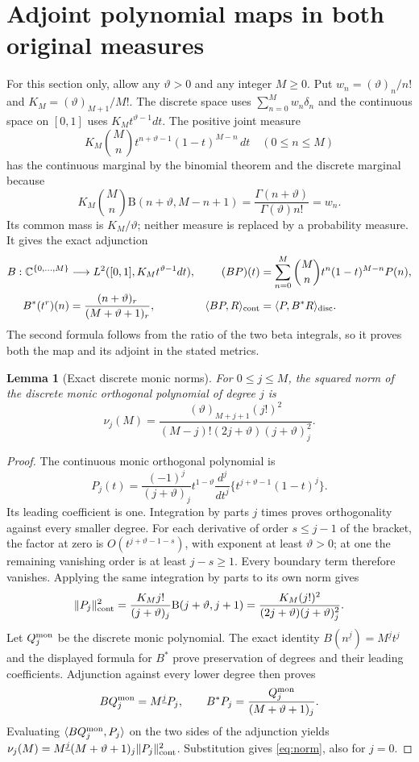 \documentclass[11pt,a4paper]{article}
\newtheorem{lemma}[theorem]{Lemma}
\newcommand{\C}{\mathbb C}
\begin{document}
\section{Adjoint polynomial maps in both original measures}
For this section only, allow any $\vartheta>0$ and any integer $M\ge0$.
Put $w_n=(\vartheta)_n/n!$ and $K_M=(\vartheta)_{M+1}/M!$.
The discrete space uses $\sum_{n=0}^Mw_n\delta_n$ and the continuous
space on $[0,1]$ uses $K_Mt^{\vartheta-1}dt$.
The positive joint measure
\[
 K_M\binom Mn t^{n+\vartheta-1}(1-t)^{M-n}\,dt
 \quad (0\le n\le M)
\]
has the continuous marginal by the binomial theorem and the discrete
marginal because
\[
 K_M\binom Mn\mathrm B(n+\vartheta,M-n+1)
 =\frac{\Gamma(n+\vartheta)}{\Gamma(\vartheta)n!}=w_n.
\]
Its common mass is $K_M/\vartheta$; neither measure is replaced by a
probability measure. It gives the exact adjunction
\begin{align*}
 B:\C^{\{0,\ldots,M\}}&\longrightarrow L^2([0,1],K_Mt^{\vartheta-1}dt),
 & (BP)(t)&=\sum_{n=0}^M\binom Mn t^n(1-t)^{M-n}P(n),\\
 B^*(t^r)(n)&=\frac{(n+\vartheta)_r}{(M+\vartheta+1)_r},
 &\langle BP,R\rangle_{\rm cont}&=\langle P,B^*R\rangle_{\rm disc}.
\end{align*}
The second formula follows from the ratio of the two beta integrals,
so it proves both the map and its adjoint in the stated metrics.

\begin{lemma}[Exact discrete monic norms]
For $0\le j\le M$, the squared norm of the discrete monic orthogonal
polynomial of degree $j$ is
\begin{equation}\label{eq:norm}
 \nu_j(M)=\frac{(\vartheta)_{M+j+1}(j!)^2}
 {(M-j)!(2j+\vartheta)(j+\vartheta)_j^2}.
\end{equation}
\end{lemma}
\begin{proof}
The continuous monic orthogonal polynomial is
\[
 P_j(t)=\frac{(-1)^j}{(j+\vartheta)_j}
 t^{1-\vartheta}\frac{d^j}{dt^j}
       \{t^{j+\vartheta-1}(1-t)^j\}.
\]
Its leading coefficient is one. Integration by parts $j$ times proves
orthogonality against every smaller degree. For each derivative of
order $s\le j-1$ of the bracket, the factor at zero is
$O(t^{j+\vartheta-1-s})$, with exponent at least $\vartheta>0$;
at one the remaining vanishing order is at least $j-s\ge1$.
Every boundary term therefore vanishes. Applying the same integration
by parts to its own norm gives
\[
 \|P_j\|_{\rm cont}^2
 =\frac{K_Mj!}{(j+\vartheta)_j}
       \mathrm B(j+\vartheta,j+1)
 =\frac{K_M(j!)^2}{(2j+\vartheta)(j+\vartheta)_j^2}.
\]
Let $Q_j^{\rm mon}$ be the discrete monic polynomial. The exact identity
$B(n^{\underline j})=M^{\underline j}t^j$ and the displayed formula
for $B^*$ prove preservation of degrees and their leading coefficients.
Adjunction against every lower degree then proves
\[
 BQ_j^{\rm mon}=M^{\underline j}P_j,\qquad
 B^*P_j=\frac{Q_j^{\rm mon}}{(M+\vartheta+1)_j}.
\]
Evaluating $\langle BQ_j^{\rm mon},P_j\rangle$ on the two sides of the
adjunction yields
$\nu_j(M)=M^{\underline j}(M+\vartheta+1)_j\|P_j\|_{\rm cont}^2$.
Substitution gives \eqref{eq:norm}, also for $j=0$.
\end{proof}
\end{document}
